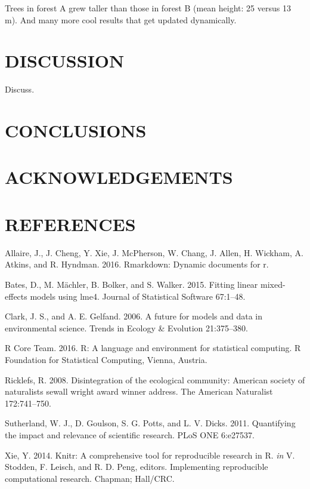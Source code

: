 \documentclass[11pt,a4paper]{article}
\begin{document}
Trees in forest A grew taller than those in forest B (mean height: 25
versus 13 m). And many more cool results that get updated dynamically.

\section{DISCUSSION}\label{discussion}

Discuss.

\section{CONCLUSIONS}\label{conclusions}

\section{ACKNOWLEDGEMENTS}\label{acknowledgements}

\section{REFERENCES}\label{references}

\hypertarget{refs}{}
\hypertarget{ref-Allaire_2016}{}
Allaire, J., J. Cheng, Y. Xie, J. McPherson, W. Chang, J. Allen, H.
Wickham, A. Atkins, and R. Hyndman. 2016. Rmarkdown: Dynamic documents
for r.

\hypertarget{ref-Bates_2015}{}
Bates, D., M. Mächler, B. Bolker, and S. Walker. 2015. Fitting linear
mixed-effects models using lme4. Journal of Statistical Software
67:1--48.

\hypertarget{ref-Clark_2006}{}
Clark, J. S., and A. E. Gelfand. 2006. A future for models and data in
environmental science. Trends in Ecology \& Evolution 21:375--380.

\hypertarget{ref-R_Core_Team_2016}{}
R Core Team. 2016. R: A language and environment for statistical
computing. R Foundation for Statistical Computing, Vienna, Austria.

\hypertarget{ref-ricklefs2008disintegration}{}
Ricklefs, R. 2008. Disintegration of the ecological community: American
society of naturalists sewall wright award winner address. The American
Naturalist 172:741--750.

\hypertarget{ref-Sutherland2011}{}
Sutherland, W. J., D. Goulson, S. G. Potts, and L. V. Dicks. 2011.
Quantifying the impact and relevance of scientific research. PLoS ONE
6:e27537.

\hypertarget{ref-Xie_2014}{}
Xie, Y. 2014. Knitr: A comprehensive tool for reproducible research in
R. \emph{in} V. Stodden, F. Leisch, and R. D. Peng, editors.
Implementing reproducible computational research. Chapman; Hall/CRC.
\end{document}
